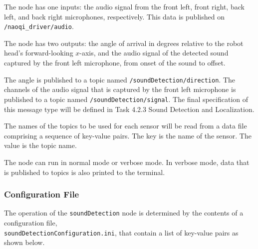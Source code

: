 \documentclass{CSSRforAfrica}
\begin{document}
{{The node has one inputs: the audio signal from the front left, front right, back left, and back right microphones, respectively.  This data is published on  {\small \verb+/naoqi_driver/audio+}.
 
The node has two outputs: the  angle  of arrival in degrees relative to the robot head's forward-looking $x$-axis, and the audio signal of the detected sound captured by the front left microphone, from onset of the sound to offset.

The angle is published to a topic named {\small \verb+/soundDetection/direction+}.   The  channels of the audio signal that is captured by the front left microphone is  published to a  topic named {\small \verb+/soundDetection/signal+}.  The final specification of this message type will be defined in Task 4.2.3 Sound Detection and Localization.

The names of the topics to be used for each sensor will be read from a data file comprising a sequence of key-value pairs. The key is the name of the sensor. The value is the topic name.   

The node can run in normal mode or verbose mode. In verbose mode, data that is published to topics is also printed to the terminal.

\subsubsection*{Configuration File}

The operation of the {\small \verb+soundDetection+} node is determined by the contents of a configuration file, \\
{\small \texttt{soundDetectionConfiguration.ini}},  that  contain a list of key-value pairs as shown below.  

}}
\end{document}
